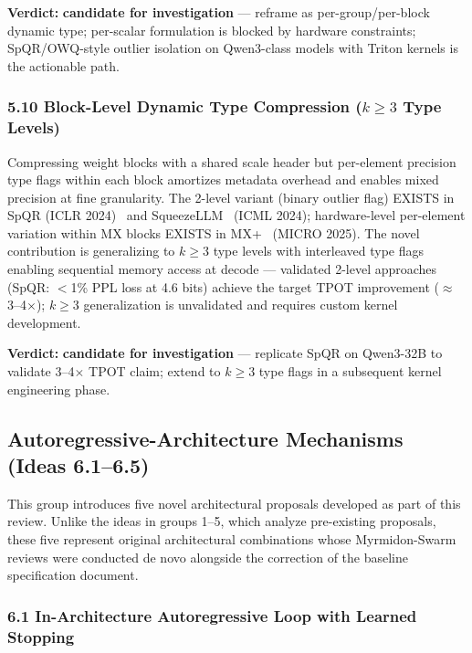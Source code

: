 \documentclass[11pt]{article}
\begin{document}
\textbf{Verdict:} \textbf{candidate for investigation} --- reframe as per-group/per-block dynamic type; per-scalar formulation is blocked by hardware constraints; SpQR/OWQ-style outlier isolation on Qwen3-class models with Triton kernels is the actionable path.

\subsubsection{5.10 Block-Level Dynamic Type Compression ($k \geq 3$ Type Levels)}
\label{sec:idea_5_10}

Compressing weight blocks with a shared scale header but per-element precision type flags within each block amortizes metadata overhead and enables mixed precision at fine granularity.
The 2-level variant (binary outlier flag) EXISTS in SpQR (ICLR 2024)~\cite{Dettmers2023SpQR} and SqueezeLLM~\cite{Kim2024SqueezeLLM} (ICML 2024); hardware-level per-element variation within MX blocks EXISTS in MX+~\cite{Lee2025MXPlus} (MICRO 2025).
The novel contribution is generalizing to $k \geq 3$ type levels with interleaved type flags enabling sequential memory access at decode --- validated 2-level approaches (SpQR: $<$1\% PPL loss at 4.6 bits) achieve the target TPOT improvement ($\approx$3--4$\times$); $k \geq 3$ generalization is unvalidated and requires custom kernel development.

\textbf{Verdict:} \textbf{candidate for investigation} --- replicate SpQR on Qwen3-32B to validate 3--4$\times$ TPOT claim; extend to $k \geq 3$ type flags in a subsequent kernel engineering phase.

\subsection{Autoregressive-Architecture Mechanisms (Ideas 6.1--6.5)}
\label{sec:group6}

This group introduces five novel architectural proposals developed as part of this review.
Unlike the ideas in groups 1--5, which analyze pre-existing proposals, these five represent original architectural combinations whose Myrmidon-Swarm reviews were conducted de novo alongside the correction of the baseline specification document.

\subsubsection{6.1 In-Architecture Autoregressive Loop with Learned Stopping}
\label{sec:idea_6_1}
\end{document}
